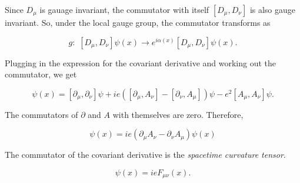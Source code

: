 \noindent Since $D_\mu$ is gauage invariant, the commutator with itself $[D_\mu, D_\nu ]$ is also gauge invariant. So, under the local gauge group, the commutator transforms as

\begin{equation}
g: \,\, [D_\mu, D_\nu] \psi (x) \rightarrow e^{i \alpha (x)} [D_\mu, D_\nu] \psi (x).
\end{equation}

\noindent Plugging in the expression for the covariant derivative and working out the commutator, we get

\begin{equation}
[D_\mu, D_\nu] \psi (x) = [\partial_\mu, \partial_\nu] \psi + i  e ( [\partial_\mu, A_\nu] - [\partial_\nu, A_\mu]) \psi - e^2 [A_\mu, A_\nu] \psi.
\end{equation}

\noindent The commutators of $\partial$ and $A$ with themselves are zero. Therefore,

\begin{equation}
[D_\mu, D_\nu] \psi (x) = i e ( \partial_\mu A_\nu - \partial_\nu A_\mu) \psi (x)
\end{equation}

\noindent The commutator of the covariant derivative is the \textit{spacetime curvature tensor}.

\begin{equation}
[D_\mu, D_\nu] \psi (x) =i e F_{\mu\nu} (x).
\end{equation}